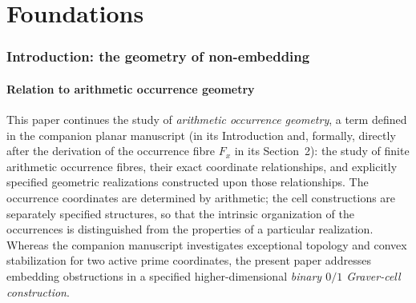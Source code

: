\part{Foundations}

\section{Introduction: the geometry of non-embedding}\label{sec:intro}

\subsection{Relation to arithmetic occurrence geometry}\label{sec:aog}

This paper continues the study of \emph{arithmetic occurrence geometry}, a term defined in the companion planar manuscript \cite{PaperA} (in its Introduction and, formally, directly after the derivation of the occurrence fibre $F_x$ in its Section~2): the study of finite arithmetic occurrence fibres, their exact coordinate relationships, and explicitly specified geometric realizations constructed upon those relationships. The occurrence coordinates are determined by arithmetic; the cell constructions are separately specified structures, so that the intrinsic organization of the occurrences is distinguished from the properties of a particular realization. Whereas the companion manuscript investigates exceptional topology and convex stabilization for two active prime coordinates, the present paper addresses embedding obstructions in a specified higher-dimensional \emph{binary $0/1$ Graver-cell construction}.

